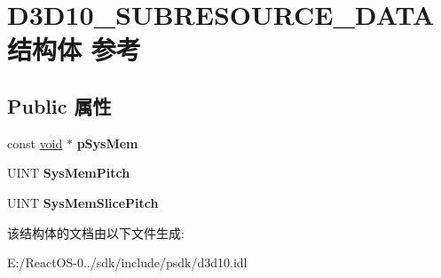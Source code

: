 \hypertarget{struct_d3_d10___s_u_b_r_e_s_o_u_r_c_e___d_a_t_a}{}\section{D3\+D10\+\_\+\+S\+U\+B\+R\+E\+S\+O\+U\+R\+C\+E\+\_\+\+D\+A\+T\+A结构体 参考}
\label{struct_d3_d10___s_u_b_r_e_s_o_u_r_c_e___d_a_t_a}
\subsection*{Public 属性}
\begin{DoxyCompactItemize}
\item 
\mbox{\label{struct_d3_d10___s_u_b_r_e_s_o_u_r_c_e___d_a_t_a_a8779c335d073007e9b66845e93019192}} 
const \hyperlink{interfacevoid}{void} $\ast$ {\bfseries p\+Sys\+Mem}
\item 
\mbox{\label{struct_d3_d10___s_u_b_r_e_s_o_u_r_c_e___d_a_t_a_a29afb1296244501c45f0fdb35d71372a}} 
U\+I\+NT {\bfseries Sys\+Mem\+Pitch}
\item 
\mbox{\label{struct_d3_d10___s_u_b_r_e_s_o_u_r_c_e___d_a_t_a_a46b892aed79ac32a042e9eb4e115ece0}} 
U\+I\+NT {\bfseries Sys\+Mem\+Slice\+Pitch}
\end{DoxyCompactItemize}


该结构体的文档由以下文件生成\+:\begin{DoxyCompactItemize}
\item 
E\+:/\+React\+O\+S-\/0../sdk/include/psdk/d3d10.\+idl\end{DoxyCompactItemize}
